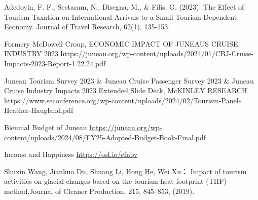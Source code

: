 \documentclass[12pt]{article}  %
\begin{document}
 \begin{thebibliography}{99}
    Adedoyin, F. F., Seetaram, N., Disegna, M., \& Filis, G. (2023). The Effect of Tourism Taxation on International Arrivals to a Small Tourism-Dependent Economy. Journal of Travel Research, 62(1), 135-153. 
     
    Formery McDowell Croup, ECONOMIC IMPACT OF JUNEAU\textquotesingle S CRUISE INDUSTRY 2023
    {https://juneau.org/wp-content/uploads/2024/01/CBJ-Cruise-Impacts-2023-Report-1.22.24.pdf}

    Juneau Tourism Survey 2023 \& Juneau Cruise Passenger Survey 2023 \& Juneau Cruise Industry Impacts 2023 Extended Slide Deck, McKINLEY RESEARCH
    {https://www.seconference.org/wp-content/uploads/2024/02/Tourism-Panel-Heather-Haugland.pdf}

    Biennial Budget of Juneau \href{https://juneau.org/wp-content/uploads/2024/08/FY25-Adopted-Budget-Book-Final.pdf}{https://juneau.org/wp-content/uploads/2024/08/FY25-Adopted-Budget-Book-Final.pdf}

   Income and Happiness \href{https://osf.io/cfnbv}{https://osf.io/cfnbv}

    Shuxin Wang, Jiankuo Du, Shuang Li, Hong He, Wei Xu：
    Impact of tourism activities on glacial changes based on the tourism heat footprint (THF) method,Journal of Cleaner Production, 215, 845--853, (2019).
   
 \end{thebibliography}
 
 
 
\end{document}
